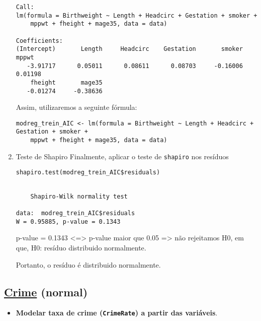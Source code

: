 \documentclass[11pt]{article}
\begin{document}
\begin{enumerate}
\begin{verbatim}
Call:
lm(formula = Birthweight ~ Length + Headcirc + Gestation + smoker + 
    mppwt + fheight + mage35, data = data)

Coefficients:
(Intercept)       Length     Headcirc    Gestation       smoker        mppwt  
   -3.91717      0.05011      0.08611      0.08703     -0.16006      0.01198  
    fheight       mage35  
   -0.01274     -0.38636  

\end{verbatim}

Assim, utilizaremos a seguinte fórmula:
\begin{verbatim}
modreg_trein_AIC <- lm(formula = Birthweight ~ Length + Headcirc + Gestation + smoker + 
    mppwt + fheight + mage35, data = data)
\end{verbatim}

\item Teste de Shapiro
\label{sec:orge8971ed}
Finalmente, aplicar o teste de \texttt{shapiro} nos resíduos

\begin{verbatim}
shapiro.test(modreg_trein_AIC$residuals)
\end{verbatim}

\begin{verbatim}

	Shapiro-Wilk normality test

data:  modreg_trein_AIC$residuals
W = 0.95885, p-value = 0.1343

\end{verbatim}


p-value = 0.1343 <=> p-value maior que 0.05 => não rejeitamos H0, em que, H0: resíduo distribuido normalmente.

Portanto, o resíduo é distribuido normalmente.
\end{enumerate}

\subsection{\href{https://www.sheffield.ac.uk/mash/statistics/datasets}{Crime} (normal)}
\label{sec:org461ce8f}
\begin{itemize}
\item \textbf{Modelar taxa de crime (\texttt{CrimeRate}) a partir das variáveis}.
\end{itemize}
\end{document}
